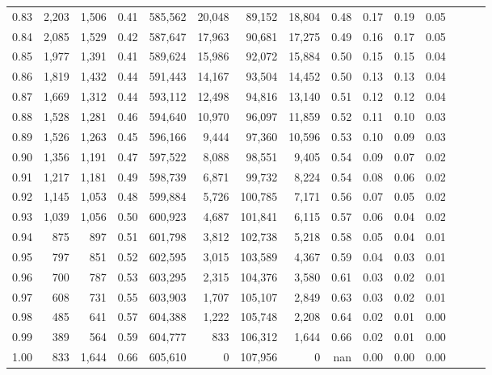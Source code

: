 \begin{tabular}{rrrrrrrrrrrrrrr}
0.83 &   2,203 &  1,506 &  0.41 &  585,562 &   20,048 &   89,152 &   18,804 &  0.48 &  0.17 &  0.19 &      0.05 \\
0.84 &   2,085 &  1,529 &  0.42 &  587,647 &   17,963 &   90,681 &   17,275 &  0.49 &  0.16 &  0.17 &      0.05 \\
0.85 &   1,977 &  1,391 &  0.41 &  589,624 &   15,986 &   92,072 &   15,884 &  0.50 &  0.15 &  0.15 &      0.04 \\
0.86 &   1,819 &  1,432 &  0.44 &  591,443 &   14,167 &   93,504 &   14,452 &  0.50 &  0.13 &  0.13 &      0.04 \\
0.87 &   1,669 &  1,312 &  0.44 &  593,112 &   12,498 &   94,816 &   13,140 &  0.51 &  0.12 &  0.12 &      0.04 \\
0.88 &   1,528 &  1,281 &  0.46 &  594,640 &   10,970 &   96,097 &   11,859 &  0.52 &  0.11 &  0.10 &      0.03 \\
0.89 &   1,526 &  1,263 &  0.45 &  596,166 &    9,444 &   97,360 &   10,596 &  0.53 &  0.10 &  0.09 &      0.03 \\
0.90 &   1,356 &  1,191 &  0.47 &  597,522 &    8,088 &   98,551 &    9,405 &  0.54 &  0.09 &  0.07 &      0.02 \\
0.91 &   1,217 &  1,181 &  0.49 &  598,739 &    6,871 &   99,732 &    8,224 &  0.54 &  0.08 &  0.06 &      0.02 \\
0.92 &   1,145 &  1,053 &  0.48 &  599,884 &    5,726 &  100,785 &    7,171 &  0.56 &  0.07 &  0.05 &      0.02 \\
0.93 &   1,039 &  1,056 &  0.50 &  600,923 &    4,687 &  101,841 &    6,115 &  0.57 &  0.06 &  0.04 &      0.02 \\
0.94 &     875 &    897 &  0.51 &  601,798 &    3,812 &  102,738 &    5,218 &  0.58 &  0.05 &  0.04 &      0.01 \\
0.95 &     797 &    851 &  0.52 &  602,595 &    3,015 &  103,589 &    4,367 &  0.59 &  0.04 &  0.03 &      0.01 \\
0.96 &     700 &    787 &  0.53 &  603,295 &    2,315 &  104,376 &    3,580 &  0.61 &  0.03 &  0.02 &      0.01 \\
0.97 &     608 &    731 &  0.55 &  603,903 &    1,707 &  105,107 &    2,849 &  0.63 &  0.03 &  0.02 &      0.01 \\
0.98 &     485 &    641 &  0.57 &  604,388 &    1,222 &  105,748 &    2,208 &  0.64 &  0.02 &  0.01 &      0.00 \\
0.99 &     389 &    564 &  0.59 &  604,777 &      833 &  106,312 &    1,644 &  0.66 &  0.02 &  0.01 &      0.00 \\
1.00 &     833 &  1,644 &  0.66 &  605,610 &        0 &  107,956 &        0 &   nan &  0.00 &  0.00 &      0.00 \\
\bottomrule
\end{tabular}
